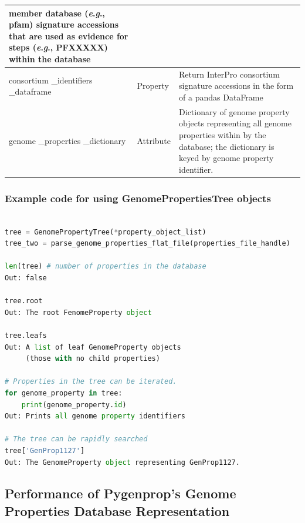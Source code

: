 \begin{longtable}{|p{2.7cm}|p{2cm}|p{10cm}|}
member database (\textit{e}.\textit{g}., \gls{pfam}) signature accessions that are used as 
evidence for steps (\textit{e}.\textit{g}., PFXXXXX) within the database                           
 \\ \hline
consortium \_identifiers \_dataframe   & Property  & Return InterPro consortium signature accessions in the form of a pandas DataFrame  \cite{mckinney2010data}                              
                          \\ \hline
genome \_properties \_dictionary    & Attribute  & Dictionary of genome property 
objects representing all genome properties within by the database; the 
dictionary is keyed by genome property identifier.                              
\\ \hline
\end{longtable}

\subsubsection{Example code for using GenomePropertiesTree objects}

\begin{lstlisting}[language=Python]

tree = GenomePropertyTree(*property_object_list)
tree_two = parse_genome_properties_flat_file(properties_file_handle)
	
len(tree) # number of properties in the database
Out: false

tree.root
Out: The root FenomeProperty object

tree.leafs
Out: A list of leaf GenomeProperty objects 
     (those with no child properties)

# Properties in the tree can be iterated.
for genome_property in tree: 
	print(genome_property.id)
Out: Prints all genome property identifiers

# The tree can be rapidly searched
tree['GenProp1127'] 
Out: The GenomeProperty object representing GenProp1127.

\end{lstlisting}

\subsection{Performance of Pygenprop's Genome Properties Database 
Representation}

